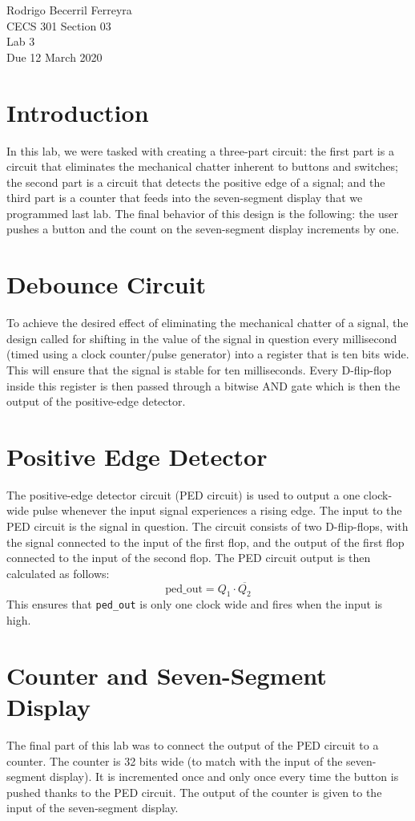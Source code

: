 \documentclass{article}
\begin{document}
\begin{flushright}
    \noindent
    Rodrigo Becerril Ferreyra\\
    CECS 301 Section 03\\
    Lab 3\\
    Due 12 March 2020
\end{flushright}

\section{Introduction} In this lab, we were tasked with creating
a three-part circuit: the first part is a circuit that eliminates
the mechanical chatter inherent to buttons and switches; the
second part is a circuit that detects the positive edge of a
signal; and the third part is a counter that feeds into the
seven-segment display that we programmed last lab. The final
behavior of this design is the following: the user pushes a
button and the count on the seven-segment display increments
by one.

\section{Debounce Circuit} To achieve the desired effect of
eliminating the mechanical chatter of a signal, the design
called for shifting in the value of the signal in question
every millisecond (timed using a clock counter/pulse generator)
into a register that is ten bits wide. This will ensure that
the signal is stable for ten milliseconds. Every D-flip-flop
inside this register is then passed through a bitwise AND gate
which is then the output of the positive-edge detector.

\section{Positive Edge Detector} The positive-edge detector
circuit (PED circuit) is used to output a one clock-wide pulse
whenever the input signal experiences a rising edge. The
input to the PED circuit is the signal in question. The circuit
consists of two D-flip-flops, with the signal connected to the
input of the first flop, and the output of the first flop
connected to the input of the second flop. The PED circuit output
is then calculated as follows:
\begin{equation*}
    \text{ped\_out} = Q_1 \cdot \overline{Q_2}
\end{equation*}
This ensures that \texttt{ped\_out} is only one clock wide
and fires when the input is high.

\section{Counter and Seven-Segment Display} The final part of
this lab was to connect the output of the PED circuit to a
counter. The counter is 32 bits wide (to match with the input
of the seven-segment display). It is incremented once and only
once every time the button is pushed thanks to the PED circuit.
The output of the counter is given to the input of the
seven-segment display.
\end{document}
